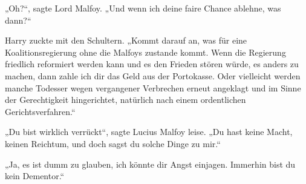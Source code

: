 „Oh?“, sagte Lord Malfoy. „Und wenn ich deine faire Chance ablehne, was dann?“

Harry zuckte mit den Schultern.
„Kommt darauf an, was für eine Koalitionsregierung ohne die Malfoys zustande kommt. Wenn die Regierung friedlich reformiert werden kann und es den Frieden stören würde, es anders zu machen, dann zahle ich dir das Geld aus der Portokasse. Oder vielleicht werden manche Todesser wegen vergangener Verbrechen erneut angeklagt und im Sinne der Gerechtigkeit hingerichtet, natürlich nach einem ordentlichen Gerichtsverfahren.“

„Du bist wirklich verrückt“, sagte Lucius Malfoy leise. „Du hast keine Macht, keinen Reichtum, und doch sagst du solche Dinge zu mir.“

„Ja, es ist dumm zu glauben, ich könnte dir Angst einjagen. Immerhin bist du kein Dementor.“

